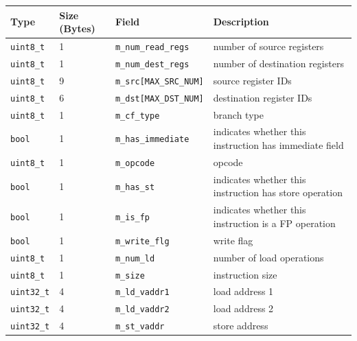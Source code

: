 \vspace{0.2in}
\begin{footnotesize}
\begin{tabular}{llll}
Type            & Size (Bytes) & Field                     & Description                                            \\ \hline
\Verb+uint8_t+  & 1            & \Verb+m_num_read_regs+    & number of source registers                             \\
\Verb+uint8_t+  & 1            & \Verb+m_num_dest_regs+    & number of destination registers                        \\
\Verb+uint8_t+  & 9            & \Verb+m_src[MAX_SRC_NUM]+ & source register IDs                                    \\
\Verb+uint8_t+  & 6            & \Verb+m_dst[MAX_DST_NUM]+ & destination register IDs                               \\
\Verb+uint8_t+  & 1            & \Verb+m_cf_type+          & branch type                                            \\
\Verb+bool+     & 1            & \Verb+m_has_immediate+    & indicates whether this instruction has immediate field \\
\Verb+uint8_t+  & 1            & \Verb+m_opcode+           & opcode                                                 \\
\Verb+bool+     & 1            & \Verb+m_has_st+           & indicates whether this instruction has store operation \\
\Verb+bool+     & 1            & \Verb+m_is_fp+            & indicates whether this instruction is a FP operation   \\
\Verb+bool+     & 1            & \Verb+m_write_flg+        & write flag                                             \\
\Verb+uint8_t+  & 1            & \Verb+m_num_ld+           & number of load operations                              \\
\Verb+uint8_t+  & 1            & \Verb+m_size+             & instruction size                                       \\
\Verb+uint32_t+ & 4            & \Verb+m_ld_vaddr1+        & load address 1                                         \\
\Verb+uint32_t+ & 4            & \Verb+m_ld_vaddr2+        & load address 2                                         \\
\Verb+uint32_t+ & 4            & \Verb+m_st_vaddr+         & store address                                          \\

\end{tabular}
\end{footnotesize}
